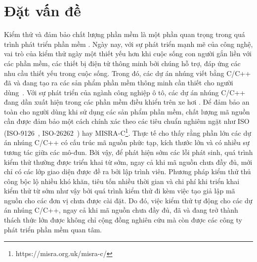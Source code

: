 \chapter*{Đặt vấn đề}\label{chap1}
Kiểm thử và đảm bảo chất lượng phần mềm là một phần quan trọng trong quá trình phát triển phần mềm \cite{GiaoTrinhKiemThu}. Ngày nay, với sự phát triển mạnh mẽ của công nghệ, vai trò của kiểm thử ngày một thiết yếu hơn khi cuộc sống con người gắn liền với các phần mềm, các thiết bị điện tử thông minh bởi chúng hỗ trợ, đáp ứng các nhu cầu thiết yếu trong cuộc sống. Trong đó, các dự án nhúng viết bằng C/C++ đã và đang tạo ra các sản phẩm phần mềm thông minh cần thiết cho người dùng~\cite{plauger1997embedded}. Với sự phát triển của ngành công nghiệp ô tô, các dự án nhúng C/C++ đang dần xuất hiện trong các phần mềm điều khiển trên xe hơi \cite{gassmann2019towards}. Để đảm bảo an toàn cho người dùng khi sử dụng các sản phẩm phần mềm, chất lượng mã nguồn cần được đảm bảo một cách chính xác theo các tiêu chuẩn nghiêm ngặt như ISO (ISO-9126~\cite{ali2017iso}, ISO-26262~\cite{Hillenbrand2012_1000025616}) hay MISRA-C\footnote{https://misra.org.uk/misra-c/}. Thực tế cho thấy rằng phần lớn các dự án nhúng C/C++ có cấu trúc mã nguồn phức tạp, kích thước lớn và có nhiều sự tương tác giữa các mô-đun. Bởi vậy, để phát hiện sớm các lỗi phát sinh, quá trình kiểm thử thường được triển khai từ sớm, ngay cả khi mã nguồn chưa đầy đủ, mới chỉ có các lớp giao diện được đề ra bởi lập trình viên. Phương pháp kiểm thử thủ công bộc lộ nhiều khó khăn, tiêu tốn nhiều thời gian và chi phí khi triển khai kiểm thử từ sớm như vậy bởi quá trình kiểm thử đi kèm việc tạo giả lập mã nguồn cho các đơn vị chưa được cài đặt. Do đó, việc kiểm thử tự động cho các dự án nhúng C/C++, ngay cả khi mã nguồn chưa đầy đủ, đã và đang trở thành thách thức lớn được không chỉ cộng đồng nghiên cứu mà còn được các công ty phát triển phần mềm quan tâm.

